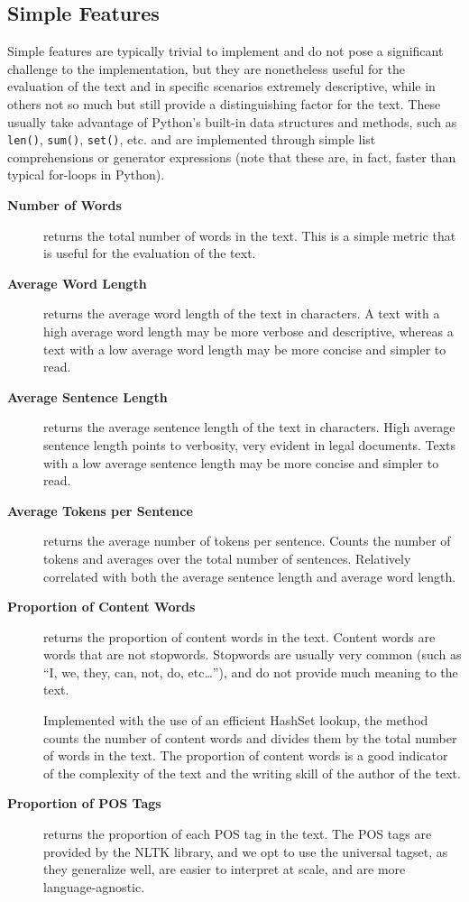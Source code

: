 \subsection{Simple Features}
Simple features are typically trivial to implement and do not pose a significant challenge to the implementation, but they are nonetheless useful for the evaluation of the text and in specific scenarios extremely descriptive, while in others not so much but still provide a distinguishing factor for the text. These usually take advantage of Python's built-in data structures and methods, such as \texttt{len()}, \texttt{sum()}, \texttt{set()}, etc. and are implemented through simple list comprehensions or generator expressions (note that these are, in fact, faster than typical for-loops in Python).
\begin{description}
    \item[\textbf{Number of Words}] returns the total number of words in the text. This is a simple metric that is useful for the evaluation of the text. 

    \item[\textbf{Average Word Length}] returns the average word length of the text in characters. A text with a high average word length may be more verbose and descriptive, whereas a text with a low average word length may be more concise and simpler to read.
    \item[\textbf{Average Sentence Length}] returns the average sentence length of the text in characters. High average sentence length points to verbosity, very evident in legal documents. Texts with a low average sentence length may be more concise and simpler to read.
    \item[\textbf{Average Tokens per Sentence}] returns the average number of tokens per sentence. Counts the number of tokens and averages over the total number of sentences. Relatively correlated with both the average sentence length and average word length.
    \item[\textbf{Proportion of Content Words}] returns the proportion of content words in the text. Content words are words that are not stopwords. Stopwords are usually very common (such as ``I, we, they, can, not, do, etc\dots''), and do not provide much meaning to the text. 
    
    Implemented with the use of an efficient HashSet lookup, the method counts the number of content words and divides them by the total number of words in the text. The proportion of content words is a good indicator of the complexity of the text and the writing skill of the author of the text. 
    \item[\textbf{Proportion of POS Tags}] returns the proportion of each POS tag in the text. The POS tags are provided by the NLTK library, and we opt to use the universal tagset, as they generalize well, are easier to interpret at scale, and are more language-agnostic. 
    

\end{description}
